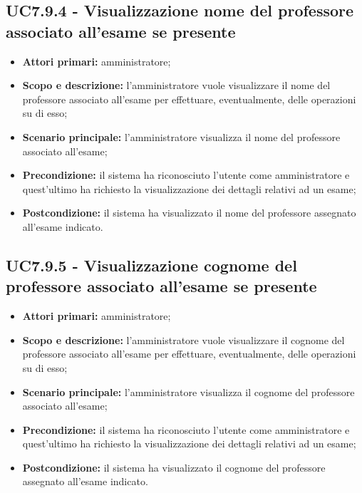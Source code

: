 \documentclass[AnalisiDeiRequisiti.tex]{subfiles}
\begin{document}
\subsection{UC7.9.4 - Visualizzazione nome del professore associato all'esame se presente}
\begin{itemize}
	\item \textbf{Attori primari:} amministratore;
	\item \textbf{Scopo e descrizione:} l'amministratore vuole visualizzare il nome del professore associato all'esame per effettuare, eventualmente, delle operazioni su di esso;
	\item \textbf{Scenario principale:} l'amministratore visualizza il nome del professore associato all'esame;
	\item \textbf{Precondizione:} il sistema ha riconosciuto l'utente come amministratore e quest'ultimo ha richiesto la visualizzazione dei dettagli relativi ad un esame; 
	\item \textbf{Postcondizione:} il sistema ha visualizzato il nome del professore assegnato all'esame indicato.
\end{itemize}
\subsection{UC7.9.5 - Visualizzazione cognome del professore associato all'esame se presente}
\begin{itemize}
	\item \textbf{Attori primari:} amministratore;
	\item \textbf{Scopo e descrizione:} l'amministratore vuole visualizzare il cognome del professore associato all'esame per effettuare, eventualmente, delle operazioni su di esso;
	\item \textbf{Scenario principale:} l'amministratore visualizza il cognome del professore associato all'esame;
	\item \textbf{Precondizione:} il sistema ha riconosciuto l'utente come amministratore e quest'ultimo ha richiesto la visualizzazione dei dettagli relativi ad un esame; 
	\item \textbf{Postcondizione:} il sistema ha visualizzato il cognome del professore assegnato all'esame indicato.
\end{itemize}
\end{document}
